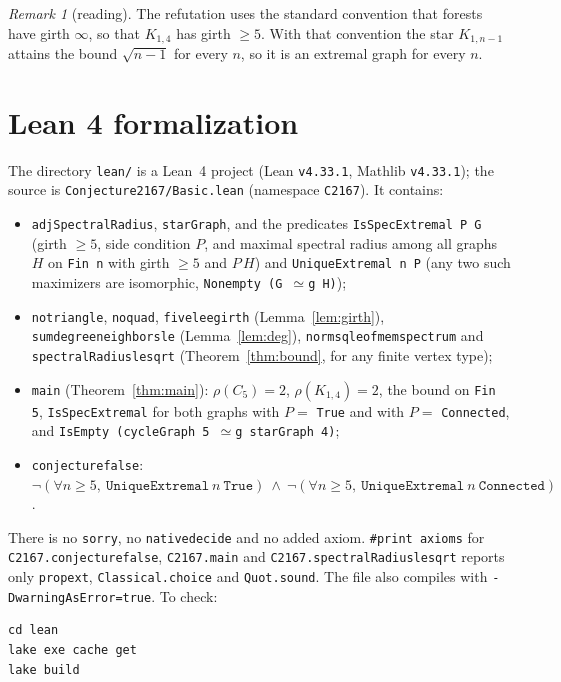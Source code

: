 \documentclass[11pt]{article}
\theoremstyle{definition}
\theoremstyle{remark}
\newtheorem{remark}[theorem]{Remark}
\renewcommand{\_}{\oldus\allowbreak}
\begin{document}
\begin{remark}[reading]
The refutation uses the standard convention that forests have girth $\infty$, so that $K_{1,4}$ has girth
$\ge5$. With that convention the star $K_{1,n-1}$ attains the bound $\sqrt{n-1}$ for every $n$, so it is an
extremal graph for every $n$.
\end{remark}

\section{Lean 4 formalization}

The directory \texttt{lean/} is a Lean~4 project (Lean \texttt{v4.33.1}, Mathlib \texttt{v4.33.1}); the
source is \texttt{Conjecture2167/Basic.lean} (namespace \texttt{C2167}). It contains:
\begin{itemize}
  \item \texttt{adjSpectralRadius}, \texttt{starGraph}, and the predicates
        \texttt{IsSpecExtremal P G} (girth $\ge5$, side condition $P$, and maximal spectral radius among all
        graphs $H$ on \texttt{Fin n} with girth $\ge5$ and $P\,H$) and \texttt{UniqueExtremal n P}
        (any two such maximizers are isomorphic, \texttt{Nonempty (G $\simeq$g H)});
  \item \texttt{no\_triangle}, \texttt{no\_quad}, \texttt{five\_le\_egirth} (Lemma~\ref{lem:girth}),
        \texttt{sum\_degree\_neighbors\_le} (Lemma~\ref{lem:deg}),
        \texttt{norm\_sq\_le\_of\_mem\_spectrum} and \texttt{spectralRadius\_le\_sqrt}
        (Theorem~\ref{thm:bound}, for any finite vertex type);
  \item \texttt{main} (Theorem~\ref{thm:main}): $\rho(C_5)=2$, $\rho(K_{1,4})=2$, the bound on
        \texttt{Fin 5}, \texttt{IsSpecExtremal} for both graphs with $P=$ \texttt{True} and with
        $P=$ \texttt{Connected}, and \texttt{IsEmpty (cycleGraph 5 $\simeq$g starGraph 4)};
  \item \texttt{conjecture\_false}:
        $\neg(\forall n\ge5,\ \texttt{UniqueExtremal}\ n\ \texttt{True})\ \wedge\
        \neg(\forall n\ge5,\ \texttt{UniqueExtremal}\ n\ \texttt{Connected})$.
\end{itemize}
There is no \texttt{sorry}, no \texttt{native\_decide} and no added axiom. \texttt{\#print axioms} for
\texttt{C2167.conjecture\_false}, \texttt{C2167.main} and \texttt{C2167.spectralRadius\_le\_sqrt} reports
only \texttt{propext}, \texttt{Classical.choice} and \texttt{Quot.sound}. The file also compiles with
\texttt{-DwarningAsError=true}. To check:
\begin{verbatim}
cd lean
lake exe cache get
lake build
\end{verbatim}
\end{document}
